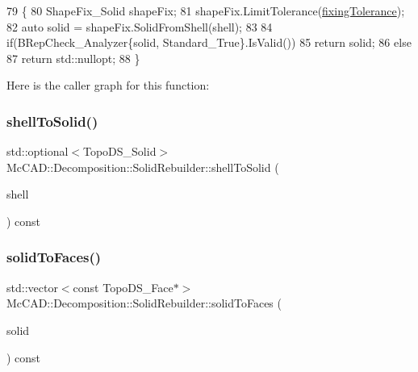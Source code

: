 \begin{DoxyCode}
79                                         \{
80     ShapeFix\_Solid shapeFix;
81     shapeFix.LimitTolerance(\hyperlink{classMcCAD_1_1Decomposition_1_1SolidRebuilder_a0daee0f1322cd101aa0f404a8aae0419}{fixingTolerance});
82     \textcolor{keyword}{auto} solid = shapeFix.SolidFromShell(shell);
83 
84     \textcolor{keywordflow}{if}(BRepCheck\_Analyzer\{solid, Standard\_True\}.IsValid())
85         \textcolor{keywordflow}{return} solid;
86     \textcolor{keywordflow}{else}
87         \textcolor{keywordflow}{return} std::nullopt;
88 \}
\end{DoxyCode}
Here is the caller graph for this function\+:
\mbox{\label{classMcCAD_1_1Decomposition_1_1SolidRebuilder_aef86b878c356fb7e3ec99a80c67c3ef9}} 
\subsubsection{\texorpdfstring{shell\+To\+Solid()}{shellToSolid()}\hspace{0.1cm}{\footnotesize\ttfamily [2/2]}}
{\footnotesize\ttfamily std\+::optional$<$Topo\+D\+S\+\_\+\+Solid$>$ Mc\+C\+A\+D\+::\+Decomposition\+::\+Solid\+Rebuilder\+::shell\+To\+Solid (\begin{DoxyParamCaption}\item[{const Topo\+D\+S\+\_\+\+Shell \&}]{shell }\end{DoxyParamCaption}) const\hspace{0.3cm}{\ttfamily [private]}}

\mbox{\label{classMcCAD_1_1Decomposition_1_1SolidRebuilder_a0d2cb98a29f9e87aedff3c727c5d1f99}} 
\subsubsection{\texorpdfstring{solid\+To\+Faces()}{solidToFaces()}\hspace{0.1cm}{\footnotesize\ttfamily [1/2]}}
{\footnotesize\ttfamily std\+::vector$<$const Topo\+D\+S\+\_\+\+Face$\ast$$>$ Mc\+C\+A\+D\+::\+Decomposition\+::\+Solid\+Rebuilder\+::solid\+To\+Faces (\begin{DoxyParamCaption}\item[{const Topo\+D\+S\+\_\+\+Solid \&}]{solid }\end{DoxyParamCaption}) const\hspace{0.3cm}{\ttfamily [private]}}

